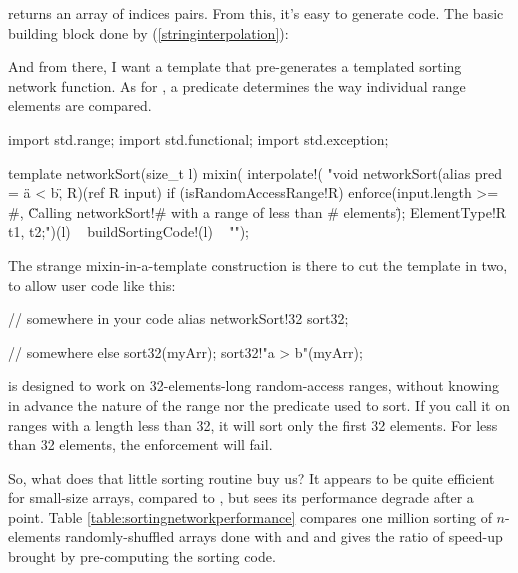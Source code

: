  returns an array of indices pairs. From this, it's easy to generate code. The basic building block done by  (\ref{stringinterpolation}):


And from there, I want a template that pre-generates a templated sorting network function. As for , a predicate  determines the way individual range elements are compared.

\begin{dcode}
import std.range;
import std.functional;
import std.exception;

template networkSort(size_t l)
{
    mixin(
interpolate!(
    "void networkSort(alias pred = \"a < b\", R)(ref R input)
     if (isRandomAccessRange!R)
     { 
         enforce(input.length >= #, 
                 \"Calling networkSort!# with a range of less than # elements\");
	      ElementType!R t1, t2;")(l)
      ~ buildSortingCode!(l) 
 ~ "}");
}
\end{dcode}

The strange mixin-in-a-template construction is there to cut the template in two, to allow user code like this:

\begin{dcode}
// somewhere in your code
alias networkSort!32 sort32;

// somewhere else
sort32(myArr);
sort32!"a > b"(myArr);
\end{dcode}

 is designed to work on 32-elements-long random-access ranges, without knowing in advance the nature of the range nor the predicate used to sort. If you call it on ranges with a length less than 32, it will sort only the first 32 elements. For less than 32 elements, the enforcement will fail.

So, what does that little sorting routine buy us? It appears to be quite efficient for small-size arrays, compared to , but sees its performance degrade after a point. Table \ref{table:sortingnetworkperformance} compares one million sorting of $n$-elements randomly-shuffled arrays done with  and  and gives the ratio of speed-up brought by pre-computing the sorting code. 


